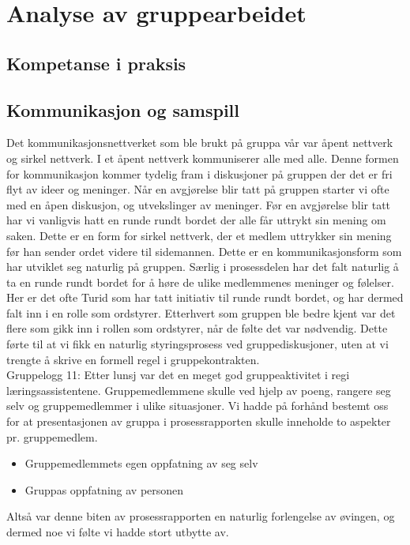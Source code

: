 
\chapter{Analyse av gruppearbeidet}

\section{Kompetanse i praksis}

\section{Kommunikasjon og samspill}
Det kommunikasjonsnettverket som ble brukt på gruppa vår var åpent nettverk og sirkel nettverk. 
I et åpent nettverk kommuniserer alle med alle. Denne formen for kommunikasjon kommer tydelig fram 
i diskusjoner på gruppen der det er fri flyt av ideer og meninger. Når en avgjørelse blir tatt på 
gruppen starter vi ofte med en åpen diskusjon, og utvekslinger av meninger. Før en avgjørelse blir 
tatt har vi vanligvis hatt en runde rundt bordet der alle får uttrykt sin mening om saken. Dette er 
en form for sirkel nettverk, der et medlem uttrykker sin mening før han sender ordet videre til sidemannen.
 Dette er en kommunikasjonsform som har utviklet seg naturlig på gruppen. Særlig i prosessdelen har 
 det falt naturlig å ta en runde rundt bordet for å høre de ulike medlemmenes meninger og følelser. 
 Her er det ofte Turid som har tatt initiativ til runde rundt bordet, og har dermed falt inn i en 
 rolle som ordstyrer. Etterhvert som gruppen ble bedre kjent var det flere som gikk inn i rollen 
 som ordstyrer, når de følte det var nødvendig. Dette førte til at vi fikk en naturlig styringsprosess
  ved gruppediskusjoner, uten at vi trengte å skrive en formell regel i gruppekontrakten.\\

Gruppelogg 11:
Etter lunsj var det en meget god gruppeaktivitet i regi læringsassistentene.
Gruppemedlemmene skulle ved hjelp av poeng, rangere seg selv og gruppemedlemmer
i ulike situasjoner. Vi hadde på forhånd bestemt oss for at presentasjonen av
gruppa i prosessrapporten skulle inneholde to aspekter pr. gruppemedlem.
\begin{itemize}
\item Gruppemedlemmets egen oppfatning av seg selv
\item Gruppas oppfatning av personen
\end{itemize}
Altså var denne biten av prosessrapporten en naturlig forlengelse av øvingen, og
dermed noe vi følte vi hadde stort utbytte av.

